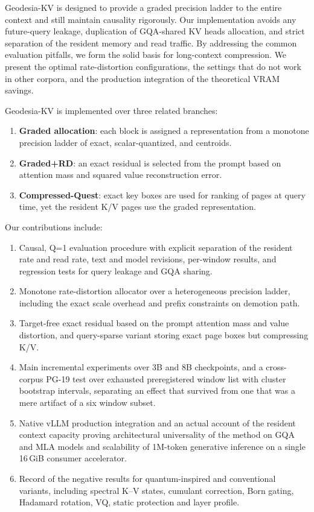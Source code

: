\documentclass[10pt,twocolumn]{article}
\newcommand{\method}{Geodesia-KV}
\newcommand{\pg}{PG-19}
\begin{document}
\method{} is designed to provide a graded precision ladder to the entire context
and still maintain causality rigorously. Our implementation avoids any
future-query leakage, duplication of GQA-shared KV heads allocation, and strict
separation of the resident memory and read traffic. By addressing the
common evaluation pitfalls, we form the solid basis for long-context
compression. We present the optimal rate-distortion configurations, the settings
that do not work in other corpora, and the production integration of the
theoretical VRAM savings.

\method{} is implemented over three related branches:

\begin{enumerate}\itemsep2pt
\item \textbf{Graded allocation}: each block is assigned a representation from a
      monotone precision ladder of exact, scalar-quantized, and centroids.
\item \textbf{Graded+RD}: an exact residual is selected from the prompt based
      on attention mass and squared value reconstruction error.
\item \textbf{Compressed-Quest}: exact key boxes are used for ranking of pages at query
      time, yet the resident K/V pages use the graded representation.
\end{enumerate}

Our contributions include:

\begin{enumerate}\itemsep2pt
\item Causal, Q=1 evaluation procedure with explicit separation of the resident
      rate and read rate, text and model revisions, per-window results, and
      regression tests for query leakage and GQA sharing.
\item Monotone rate-distortion allocator over a heterogeneous precision
      ladder, including the exact scale overhead and prefix constraints on
      demotion path.
\item Target-free exact residual based on the prompt attention mass and value
      distortion, and query-sparse variant storing exact page boxes but
      compressing K/V.
\item Main incremental experiments over 3B and 8B checkpoints, and a cross-corpus
      \pg{} test over exhausted preregistered window list with cluster bootstrap
      intervals, separating an effect that survived from one that was a mere
      artifact of a six window subset.
\item Native vLLM production integration and an actual account of the resident
      context capacity proving architectural universality of the method on
      GQA and MLA models and scalability of 1M-token generative inference on a single 16\,GiB consumer accelerator.
\item Record of the negative results for quantum-inspired and conventional variants,
      including spectral K--V states, cumulant correction, Born gating, Hadamard rotation, VQ,
      static protection and layer profile.
\end{enumerate}
\end{document}
